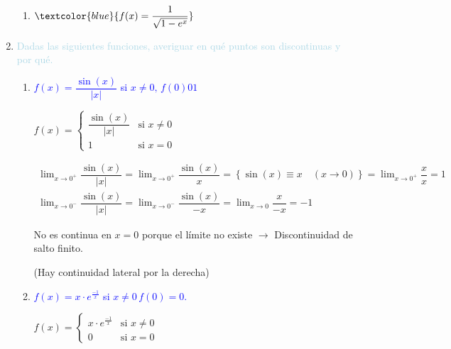 \begin{enumerate}[label=\color{red}\textbf{\arabic*)}, leftmargin=*]
\begin{enumerate}[label=\color{red}\alph*)]
		\item $\textcolor{blue}{f(x)=\dfrac{1}{\sqrt{1-e^x}}}$
	\end{enumerate}
	\item \textcolor{lightblue}{Dadas las siguientes funciones, averiguar en qué puntos son discontinuas y por qué.}
	\begin{enumerate}[label=\color{red}\alph*)]
		\item \textcolor{blue}{$f(x)=\dfrac{\sin(x)}{|x|}$ si $x\neq0,\,f(0)01$}
		
		$f(x)=\begin{cases}
			\dfrac{\sin(x)}{|x|} & \text{si }x\neq0\\
			1 & \text{si }x=0
		\end{cases}$
		
		$\begin{array}{l}
			\lim_{x\to0^+}\dfrac{\sin(x)}{|x|}=\lim_{x\to0^+}\dfrac{\sin(x)}{x}=\left\{\sin(x)\equiv x\quad(x\to0)\right\}=\lim_{x\to0^+}\dfrac{x}{x}=1\\
			\lim_{x\to0^-}\dfrac{\sin(x)}{|x|}=\lim_{x\to0^-}\dfrac{\sin(x)}{-x}=\lim_{x\to0}\dfrac{x}{-x}=-1
		\end{array}$
		
		No es continua en $x=0$ porque el límite no existe $\longrightarrow$ Discontinuidad de salto finito.
		
		(Hay continuidad lateral por la derecha)
		
		\item \textcolor{blue}{$f(x)=x\cdot e^{\frac{-1}{x}}$ si $x\neq0\,f(0)=0$.}
		
		$f(x)=\begin{cases}
			x\cdot e^{\frac{-1}{x}} & \text{si } x\neq0\\
			0 & \text{si }x=0
		\end{cases}$
		

\end{enumerate}
\end{enumerate}
